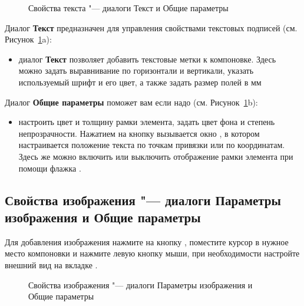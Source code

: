 \begin{figure}[ht]
\centering
   \hspace{1cm}
   \caption{Свойства текста "--- диалоги Текст и Общие параметры \wincaption}\label{fig:label_option}
\end{figure}


Диалог \textbf{Текст} предназначен для управления свойствами текстовых
подписей (см. Рисунок~\ref{fig:label_option}a):

\begin{itemize}[label=--]
\item диалог \textbf{Текст} позволяет добавить текстовые метки к
компоновке. Здесь можно задать выравнивание по горизонтали и вертикали,
указать используемый шрифт и его цвет, а также задать размер полей в мм
\end{itemize}


Диалог \textbf{Общие параметры} поможет вам если надо
(см. Рисунок~\ref{fig:label_option}b):

\begin{itemize}[label=--]
\item настроить цвет и толщину рамки элемента, задать
цвет фона и степень непрозрачности. Нажатием на кнопку 
вызывается окно , в котором настраивается
положение текста по точкам привязки или по координатам. Здесь же можно
включить или выключить отображение рамки элемента при помощи флажка
.
\end{itemize}

\subsection{Свойства изображения "--- диалоги Параметры изображения и Общие параметры}

Для добавления изображения нажмите на кнопку
, поместите
курсор в нужное место компоновки и нажмите левую кнопку мыши, при
необходимости настройте внешний вид на вкладке .

\begin{figure}[ht]
\centering
     \hspace{1cm}
   \caption{Свойства изображения "--- диалоги Параметры изображения и Общие параметры \wincaption}\label{fig:imageoptions}
\end{figure}

